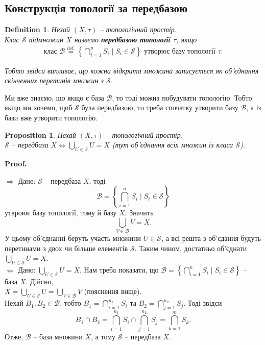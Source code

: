 \documentclass[a4paper, 10pt]{article}
\makeatletter
\def\rightproof{$\boxed{\Rightarrow}$ }
\def\leftproof{$\boxed{\Leftarrow}$ }
\theoremstyle{theoremdd}
\newtheorem{definition}[theorem]{Definition}
\newtheorem{proposition}[theorem]{Proposition}
\renewenvironment{proof}[1][Proof.\\]{\par
\pushQED{\hfill \qed}%
\normalfont \topsep6\p@\@plus6\p@\relax
\trivlist
\item\relax
{\bfseries
#1\@addpunct{.}}\hspace\labelsep\ignorespaces
}{%
\popQED\endtrivlist\@endpefalse
}
\makeatother
\begin{document}
\subsection{Конструкція топології за передбазою}
\begin{definition}
Нехай $(X,\tau)$ -- топологічний простір.\\
Клас $\mathcal{S}$ підмножин $X$ назвемо \textbf{передбазою топології $\tau$}, якщо
\begin{align*}
\text{клас }\mathcal{B} \overset{\text{def.}}{=} \left\{ \bigcap_{i=1}^n S_i \mid S_i \in \mathcal{S} \right\} \text{ утворює базу топології } \tau.
\end{align*}

Тобто звідси випливає, що кожна відкрита множина записується як об'єднання скінченних перетинів множин з $\mathcal{S}$.
\end{definition}

\noindent Ми вже знаємо, що якщо є база $\mathcal{B}$, то тоді можна побудувати топологію. Тобто якщо ми хочемо, щоб $\mathcal{S}$ була передбазою, то треба спочатку утворити базу $\mathcal{B}$, а із бази вже утворити топологію.

\begin{proposition}
Нехай $(X,\tau)$ -- топологічний простір.\\
$\mathcal{S}$ -- передбаза $X \iff \displaystyle\bigcup_{U \in \mathcal{S}} U = X$ (тут об'єднання всіх множин із класа $\mathcal{S}$).
\end{proposition}

\begin{proof}
\rightproof Дано: $\mathcal{S}$ -- передбаза $X$, тоді 
\[
\mathcal{B} = \displaystyle\left\{ \bigcap_{i=1}^n S_i \mid S_i \in \mathcal{S} \right\}
\] утвроює базу топології, тому й базу $X$. Значить \[
\displaystyle\bigcup_{V \in \mathcal{B}} V = X.
\]
У цьому об'єднанні беруть участь множини $U \in \mathcal{S}$, а всі решта з об'єдання будуть перетинами з двох чи більше елементів $\mathcal{S}$. Таким чином, достатньо об'єднати $\displaystyle\bigcup_{U \in \mathcal{S}} U = X$.
\bigskip \\
\leftproof Дано: $\displaystyle\bigcup_{U \in \mathcal{S}} U = X$. Нам треба показати, що $\mathcal{B} = \displaystyle\left\{ \bigcap_{i=1}^n S_i \mid S_i \in \mathcal{S} \right\}$ -- база $X$. Дійсно,\\
$X = \displaystyle\bigcup_{U \in \mathcal{S}} U = \bigcup_{V \in \mathcal{B}} V$ (пояснення вище).\\
Нехай $B_1,B_2 \in \mathcal{B}$, тобто $\displaystyle B_1 = \bigcap_{i=1}^{n_1} S_i$ та $\displaystyle B_2 = \bigcap_{j=1}^{n_2} S_j$. Тоді звідси 
\[
B_1 \cap B_2 = \displaystyle\bigcap_{i=1}^{n_1} S_i \cap \bigcap_{j=1}^{n_2} S_j = \bigcap_{k=1}^{m} S_k.
\]
Отже, $\mathcal{B}$ -- база множини $X$, а тому $\mathcal{S}$ -- передбаза $X$.
\end{proof}
\end{document}
